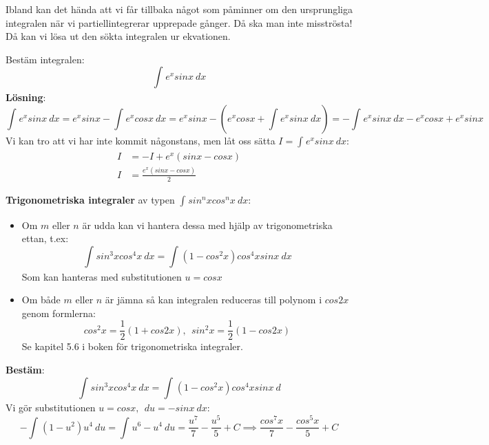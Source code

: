 \documentclass{report}
\begin{document}
\noindent
Ibland kan det hända att vi får tillbaka något som påminner om den ursprungliga integralen när vi partiellintegrerar upprepade gånger. Då ska man inte misströsta! Då kan vi lösa ut den sökta integralen ur ekvationen.

\ex{}
{
Bestäm integralen:
\begin{equation*}
	\int_{}^{} e^x sinx\: dx 
\end{equation*}
\textbf{Lösning}:
\begin{equation*}
	\int_{}^{} e^x sinx \: dx = e^xsinx - \int_{}^{} e^x cosx \: dx = e^xsinx -( e^xcosx + \int_{}^{} e^x sinx \: dx ) = -\int_{}^{} e^x sinx \: dx - e^x cosx + e^x sinx  
\end{equation*}
Vi kan tro att vi har inte kommit någonstans, men låt oss sätta $ I = \int_{}^{} e^x sinx \: dx  $:
\begin{align*}
	I &= -I + e^x(sinx-cosx) \\
	I &= \frac{e^x(sinx-cosx)}{2} 
\end{align*}
}

\vspace{20pt}
\noindent
\textbf{Trigonometriska integraler} av typen $ \int_{}^{} sin^nx cos^nx \: dx $:
\begin{itemize}
	\item Om $ m $ eller $ n $ är udda kan vi hantera dessa med hjälp av trigonometriska ettan, t.ex:
	\begin{equation*}
	\int_{}^{} sin^3xcos^4x \: dx = \int_{}^{} (1-cos^2x)cos^4xsinx \: dx
	\end{equation*}
	Som kan hanteras med substitutionen $ u = cosx $
	\item Om både $ m $ eller $ n $ är jämna så kan integralen reduceras till polynom i $ cos2x $ genom formlerna:
	\begin{equation*}
	cos^2x = \frac{1}{2} (1 + cos2x),\:\: sin^2x = \frac{1}{2} (1-cos2x)
	\end{equation*}
	Se kapitel 5.6 i boken för trigonometriska integraler.
\end{itemize}

{
\textbf{Bestäm}:
\begin{equation*}
\int_{}^{} sin^3xcos^4x \: dx = \int_{}^{} (1-cos^2x)cos^4x sinx \: d 
\end{equation*}
Vi gör substitutionen $ u = cosx,\:\: du = -sinx\:dx $:
\begin{equation*}
- \int_{}^{} (1-u^2)u^4 \: du = \int_{}^{} u^6-u^4 \: du = \frac{u^7}{7} - \frac{u^5}{5} + C \implies  \frac{cos^7x}{7} - \frac{cos^5x}{5} + C   
\end{equation*}
}
\end{document}
